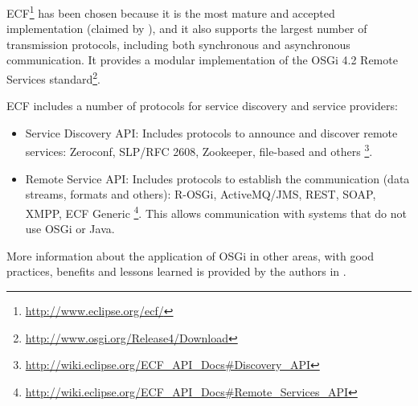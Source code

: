 ECF\footnote{\url{http://www.eclipse.org/ecf/}} has
 been chosen because it is the most mature and accepted implementation
 (claimed by  \cite{petzold2011dynamic}), %
and it also supports the largest number of transmission protocols,
including both synchronous and asynchronous communication. It provides
a modular implementation of the OSGi 4.2 Remote Services
standard\footnote{\url{http://www.osgi.org/Release4/Download}}. %

ECF includes a number of protocols for service discovery and service providers:
\begin{itemize}
\item Service Discovery API: Includes protocols to announce and discover remote services: Zeroconf, SLP/RFC 2608, Zookeeper, file-based and others \footnote{\url{http://wiki.eclipse.org/ECF_API_Docs\#Discovery_API}}.
\item Remote Service API: Includes protocols to establish the communication (data streams, formats and others): R-OSGi, ActiveMQ/JMS, REST, SOAP, XMPP, ECF Generic \footnote{\url{http://wiki.eclipse.org/ECF_API_Docs\#Remote_Services_API}}. This allows communication with systems that do not use OSGi or Java.
\end{itemize}

More information about the application of OSGi in other areas, with
good practices, benefits and lessons learned is provided by the
authors in \cite{GarciaSanchez2013Gateway}. 





